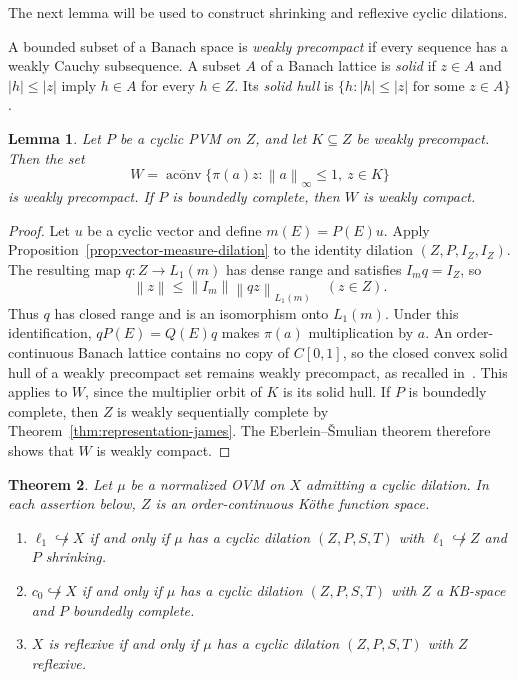 \documentclass[11pt,leqno]{amsart}
\theoremstyle{compact}
\numberwithin{equation}{section}
\newtheorem{theorem}{Theorem}[section]
\newtheorem{lemma}[theorem]{Lemma}
\theoremstyle{compactremark}
\theoremstyle{compact}
\newcommand{\1}{\mathbbm{1}}
\newcommand{\norm}[1]{\left\|#1\right\|}
\newcommand{\abs}[1]{\left|#1\right|}
\begin{document}
The next lemma will be used to construct shrinking and reflexive cyclic dilations.

A bounded subset of a Banach space is \emph{weakly precompact} if every sequence has a weakly Cauchy subsequence. A subset $A$ of a Banach lattice is \emph{solid} if $z\in A$ and $\abs{h}\leq\abs{z}$ imply $h\in A$ for every $h\in Z$. Its \emph{solid hull} is $\{h:\abs{h}\leq\abs{z}\text{ for some }z\in A\}$.

\begin{lemma}\label{lem:multiplier-hull}
Let $P$ be a cyclic PVM on $Z$, and let $K\subseteq Z$ be weakly precompact. Then the set
\[
W=\overline{\operatorname{aconv}}\{\pi(a)z:\norm{a}_\infty\leq1,\ z\in K\}
\]
is weakly precompact. If $P$ is boundedly complete, then $W$ is weakly compact.
\end{lemma}

\begin{proof}
Let $u$ be a cyclic vector and define $m(E)=P(E)u$. Apply Proposition~\ref{prop:vector-measure-dilation} to the identity dilation $(Z,P,I_Z,I_Z)$. The resulting map $q\colon Z\to L_1(m)$ has dense range and satisfies $I_mq=I_Z$, so
\[
\norm{z}\leq\norm{I_m}\norm{qz}_{L_1(m)}\quad(z\in Z).
\]
Thus $q$ has closed range and is an isomorphism onto $L_1(m)$. Under this identification, $qP(E)=Q(E)q$ makes $\pi(a)$ multiplication by $a$. An order-continuous Banach lattice contains no copy of $C[0,1]$, so the closed convex solid hull of a weakly precompact set remains weakly precompact, as recalled in~\cite[proof of Theorem~4.5]{AvilesGuiraoLajaraRodriguezTradacete2016}. This applies to $W$, since the multiplier orbit of $K$ is its solid hull. If $P$ is boundedly complete, then $Z$ is weakly sequentially complete by Theorem~\ref{thm:representation-james}. The Eberlein--\v Smulian theorem therefore shows that $W$ is weakly compact.
\end{proof}

\begingroup
\begin{theorem}\label{thm:dilation-geometry}
Let $\mu$ be a normalized OVM on $X$ admitting a cyclic dilation. In each assertion below, $Z$ is an order-continuous K\"othe function space.
\begin{enumerate}
\item $\ell_1\not\hookrightarrow X$ if and only if $\mu$ has a cyclic dilation $(Z,P,S,T)$ with $\ell_1\not\hookrightarrow Z$ and $P$ shrinking.
\item $c_0\not\hookrightarrow X$ if and only if $\mu$ has a cyclic dilation $(Z,P,S,T)$ with $Z$ a KB-space and $P$ boundedly complete.
\item $X$ is reflexive if and only if $\mu$ has a cyclic dilation $(Z,P,S,T)$ with $Z$ reflexive.
\end{enumerate}
\end{theorem}
\endgroup
\end{document}
